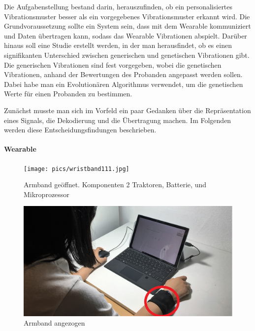 
Die Aufgabenstellung bestand darin, herauszufinden, ob ein personalisiertes Vibrationsmuster besser als ein vorgegebenes Vibrationsmuster erkannt wird.
Die Grundvoraussetzung sollte ein System sein, dass mit dem Wearable kommuniziert und Daten {\"u}bertragen kann, sodass das Wearable Vibrationen abspielt. 
Dar{\"u}ber hinaus soll eine Studie erstellt werden, in der man herausfindet, ob es einen signifikanten Unterschied zwischen generischen und genetischen Vibrationen gibt. 
Die generischen Vibrationen sind fest vorgegeben, wobei die genetischen Vibrationen, anhand der Bewertungen des Probanden angepasst werden sollen. 
Dabei habe man ein Evolution{\"a}ren Algorithmus verwendet, um die genetischen Werte f{\"u}r einen Probanden zu bestimmen. 

Zun{\"a}chst musste man sich im Vorfeld ein paar Gedanken {\"u}ber die Repr{\"a}sentation eines Signals, die Dekodierung und die {\"U}bertragung machen.
Im Folgenden werden diese Entscheidungsfindungen beschrieben.

\paragraph{Wearable}

\begin{figure}
	\centering
    \texttt{[image: pics/wristband111.jpg]}
    \caption{Armband ge{\"o}ffnet. Komponenten 2 Traktoren, Batterie, und Mikroprozessor}
    \label{fig:wristband1}
\end{figure}

\begin{figure}
	\centering
    \includegraphics[width=\textwidth]{pics/peter.jpg}
    \caption{Armband angezogen}
    \label{fig:wristband2}
\end{figure}

